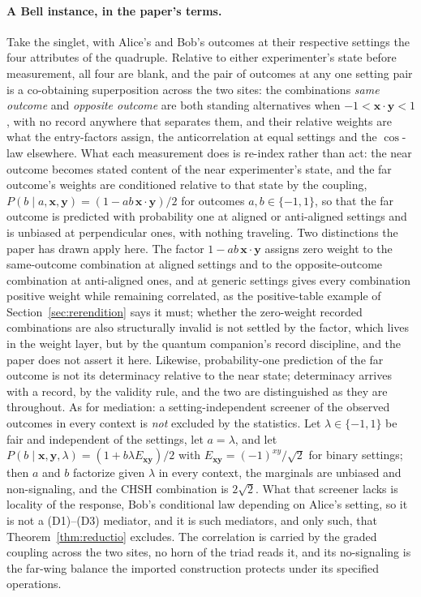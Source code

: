 \documentclass[11pt]{article}
\begin{document}
\paragraph{A Bell instance, in the paper's terms.} Take the singlet, with Alice's and Bob's outcomes at their respective settings the four attributes of the quadruple. Relative to either experimenter's state before measurement, all four are blank, and the pair of outcomes at any one setting pair is a co-obtaining superposition across the two sites: the combinations \emph{same outcome} and \emph{opposite outcome} are both standing alternatives when $-1 < \mathbf{x}\cdot\mathbf{y} < 1$, with no record anywhere that separates them, and their relative weights are what the entry-factors assign, the anticorrelation at equal settings and the $\cos$-law elsewhere. What each measurement does is re-index rather than act: the near outcome becomes stated content of the near experimenter's state, and the far outcome's weights are conditioned relative to that state by the coupling, $P(b \mid a, \mathbf{x}, \mathbf{y}) = (1 - ab\,\mathbf{x}\cdot\mathbf{y})/2$ for outcomes $a, b \in \{-1, 1\}$, so that the far outcome is predicted with probability one at aligned or anti-aligned settings and is unbiased at perpendicular ones, with nothing traveling. Two distinctions the paper has drawn apply here. The factor $1 - ab\,\mathbf{x}\cdot\mathbf{y}$ assigns zero weight to the same-outcome combination at aligned settings and to the opposite-outcome combination at anti-aligned ones, and at generic settings gives every combination positive weight while remaining correlated, as the positive-table example of Section~\ref{sec:rerendition} says it must; whether the zero-weight recorded combinations are also structurally invalid is not settled by the factor, which lives in the weight layer, but by the quantum companion's record discipline, and the paper does not assert it here. Likewise, probability-one prediction of the far outcome is not its determinacy relative to the near state; determinacy arrives with a record, by the validity rule, and the two are distinguished as they are throughout. As for mediation: a setting-independent screener of the observed outcomes in every context is \emph{not} excluded by the statistics. Let $\lambda \in \{-1, 1\}$ be fair and independent of the settings, let $a = \lambda$, and let $P(b \mid \mathbf{x}, \mathbf{y}, \lambda) = (1 + b\lambda E_{\mathbf{x}\mathbf{y}})/2$ with $E_{\mathbf{x}\mathbf{y}} = (-1)^{xy}/\sqrt2$ for binary settings; then $a$ and $b$ factorize given $\lambda$ in every context, the marginals are unbiased and non-signaling, and the CHSH combination is $2\sqrt2$. What that screener lacks is locality of the response, Bob's conditional law depending on Alice's setting, so it is not a (D1)--(D3) mediator, and it is such mediators, and only such, that Theorem~\ref{thm:reductio} excludes. The correlation is carried by the graded coupling across the two sites, no horn of the triad reads it, and its no-signaling is the far-wing balance the imported construction protects under its specified operations.
\end{document}
